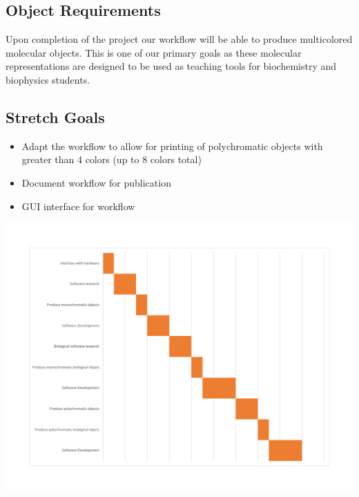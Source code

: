 \documentclass[letterpaper, onecolumn, draftclsnofoot, 10pt, compsoc]{IEEEtran}
\begin{document}
    \subsection{Object Requirements}
    Upon completion of the project our workflow will be able to produce multicolored molecular objects. This is one of our primary goals as these molecular representations are designed to be used as teaching tools for biochemistry and biophysics students.
    
    \subsection{Stretch Goals}
    \begin{itemize}
    	\item Adapt the workflow to allow for printing of polychromatic objects with greater than 4 colors (up to 8 colors total)
        \item Document workflow for publication
        \item GUI interface for workflow
    \end{itemize}

\newpage
{}
  \begin{center}
  \includegraphics[width=7in]{gantt}
  \end{center}
\end{document}

